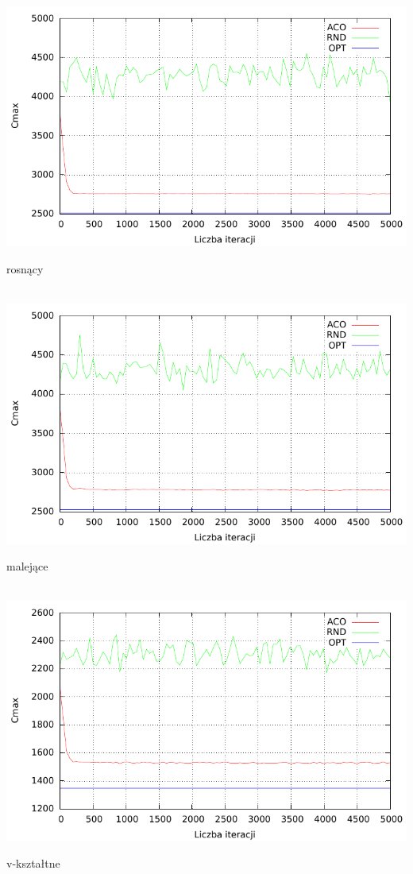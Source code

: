 \documentclass[10pt,a4paper]{article}
\begin{document}
\begin{center}
\includegraphics{./figures/inst02_asc_smooth.pdf}
\caption{rosnący}
\\
\includegraphics{./figures/inst03_dsc_smooth.pdf}
\caption{malejące}
\\
\includegraphics{./figures/inst04_vsh_smooth.pdf}
\caption{v-kształtne}
\\
\end{center}
\end{document}
